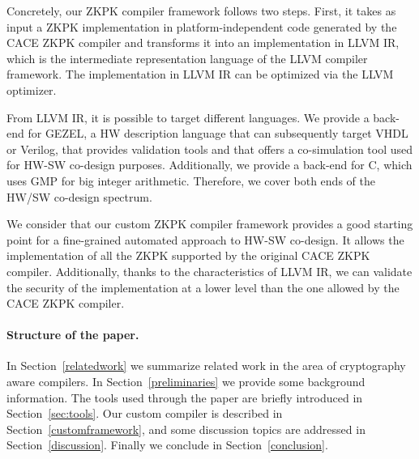 Concretely, our ZKPK compiler framework follows two steps. First, it takes as input a ZKPK implementation in platform-independent code generated by the CACE ZKPK compiler and transforms it into an implementation in LLVM IR, which is the intermediate representation language of the LLVM compiler framework. The implementation in LLVM IR can be optimized via the LLVM optimizer.

From LLVM IR, it is possible to target different languages. We provide a back-end for GEZEL, a HW description language that can subsequently target VHDL or Verilog, that provides validation tools and that offers a co-simulation tool used for HW-SW co-design purposes. Additionally, we provide a back-end for C, which uses GMP for big integer arithmetic. Therefore, we cover both ends of the HW/SW co-design spectrum.

We consider that our custom ZKPK compiler framework provides a good starting point for a fine-grained automated approach to HW-SW co-design. It  allows the implementation of all the ZKPK supported by the original CACE ZKPK compiler. Additionally, thanks to the characteristics of LLVM IR, we can validate the security of the implementation at a lower level than the one allowed by the CACE ZKPK compiler.

\paragraph{Structure of the paper.} In Section~\ref{relatedwork} we summarize related work in the area of cryptography aware compilers. In Section~\ref{preliminaries} we provide some background information. The tools used through the paper are briefly introduced in Section~\ref{sec:tools}. Our custom compiler is described in Section~\ref{customframework}, and some discussion topics are addressed in Section~\ref{discussion}. Finally we conclude in Section~\ref{conclusion}.

